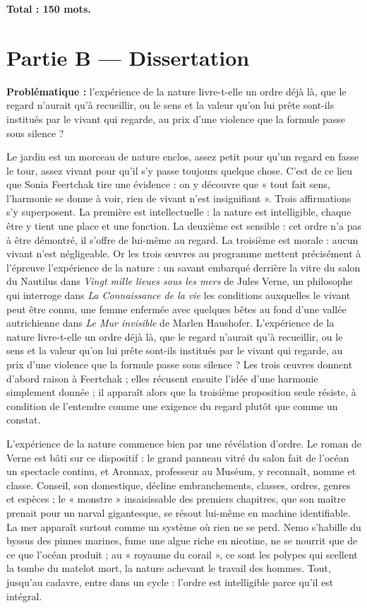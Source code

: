 \documentclass[11pt,a4paper]{article}
\begin{document}
\textbf{Total : 150 mots.}

\hypertarget{partie-b-dissertation}{%
\section{Partie B --- Dissertation}\label{partie-b-dissertation}}

\textbf{Problématique :} l'expérience de la nature livre-t-elle un ordre déjà là, que le regard n'aurait qu'à recueillir, ou le sens et la valeur qu'on lui prête sont-ils institués par le vivant qui regarde, au prix d'une violence que la formule passe sous silence ?

Le jardin est un morceau de nature enclos, assez petit pour qu'un regard en fasse le tour, assez vivant pour qu'il s'y passe toujours quelque chose. C'est de ce lieu que Sonia Feertchak tire une évidence : on y découvre que « tout fait sens, l'harmonie se donne à voir, rien de vivant n'est insignifiant ». Trois affirmations s'y superposent. La première est intellectuelle : la nature est intelligible, chaque être y tient une place et une fonction. La deuxième est sensible : cet ordre n'a pas à être démontré, il s'offre de lui-même au regard. La troisième est morale : aucun vivant n'est négligeable. Or les trois œuvres au programme mettent précisément à l'épreuve l'expérience de la nature : un savant embarqué derrière la vitre du salon du Nautilus dans \emph{Vingt mille lieues sous les mers} de Jules Verne, un philosophe qui interroge dans \emph{La Connaissance de la vie} les conditions auxquelles le vivant peut être connu, une femme enfermée avec quelques bêtes au fond d'une vallée autrichienne dans \emph{Le Mur invisible} de Marlen Haushofer. L'expérience de la nature livre-t-elle un ordre déjà là, que le regard n'aurait qu'à recueillir, ou le sens et la valeur qu'on lui prête sont-ils institués par le vivant qui regarde, au prix d'une violence que la formule passe sous silence ? Les trois œuvres donnent d'abord raison à Feertchak ; elles récusent ensuite l'idée d'une harmonie simplement donnée ; il apparaît alors que la troisième proposition seule résiste, à condition de l'entendre comme une exigence du regard plutôt que comme un constat.

L'expérience de la nature commence bien par une révélation d'ordre. Le roman de Verne est bâti sur ce dispositif : le grand panneau vitré du salon fait de l'océan un spectacle continu, et Aronnax, professeur au Muséum, y reconnaît, nomme et classe. Conseil, son domestique, décline embranchements, classes, ordres, genres et espèces ; le « monstre » insaisissable des premiers chapitres, que son maître prenait pour un narval gigantesque, se résout lui-même en machine identifiable. La mer apparaît surtout comme un système où rien ne se perd. Nemo s'habille du byssus des pinnes marines, fume une algue riche en nicotine, ne se nourrit que de ce que l'océan produit ; au « royaume du corail », ce sont les polypes qui scellent la tombe du matelot mort, la nature achevant le travail des hommes. Tout, jusqu'au cadavre, entre dans un cycle : l'ordre est intelligible parce qu'il est intégral.
\end{document}
